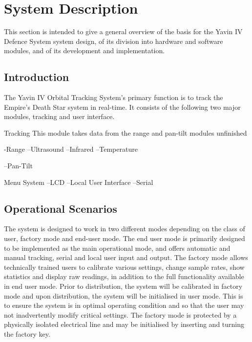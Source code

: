 \documentclass[]{report}
\begin{document}
\chapter{System Description}
This section is intended to give a general overview of the basis for the Yavin IV Defence System system design, of its division into hardware and software modules, and of its development and implementation.

\section{Introduction}

The Yavin IV Orbital Tracking System's primary function is to track the Empire's Death Star system in real-time.
It consists of the following two major modules, tracking and user interface.


Tracking
This module takes data from the range and pan-tilt modules
unfinished

-Range
--Ultrasound
--Infrared
--Temperature

--Pan-Tilt

Menu System
--LCD
--Local User Interface
--Serial

\section{Operational Scenarios}

The system is designed to work in two different modes depending on the class of user, factory mode and end-user mode.\newline
The end user mode is primarily designed to be implemented as the main operational mode, and offers automatic and manual tracking, serial and local user input and output. The factory mode allows technically trained users to calibrate various settings, change sample rates, show statistics and display raw readings, in addition to the full functionality available in end user mode.\newline
Prior to distribution, the system will be calibrated in factory mode and upon distribution, the system will be initialised in user mode. This is to ensure the system is in optimal operating condition and so that the user may not inadvertently modify critical settings. \newline
The factory mode is protected by a physically isolated electrical line and may be initialised by inserting and turning the factory key.
\end{document}
